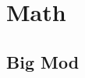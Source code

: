 %                 
%                 
%                 
%                 

%                 
%                 

\section{Math}
        \subsection{Big Mod}
                
%                 
%                 
